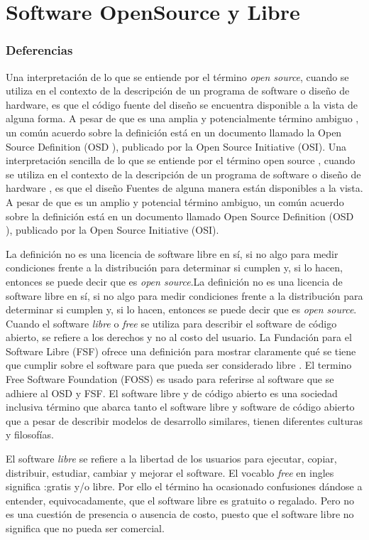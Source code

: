 \chapter{Software OpenSource y Libre}
		\subsection{Deferencias} 
Una interpretación de lo que se entiende por el término \textit{open source}, cuando se utiliza en el contexto de la descripción de un programa de software o diseño de hardware, es que el código fuente del diseño se encuentra disponible a la vista de alguna forma. A pesar de que es una amplia y potencialmente término ambiguo , un común acuerdo sobre la definición está en un documento llamado la Open Source Definition (OSD ), publicado por la Open Source Initiative (OSI).
Una interpretación sencilla de lo que se entiende por el término open source , cuando se utiliza en el contexto de la descripción de un programa de software o diseño de hardware , es que el diseño Fuentes de alguna manera están disponibles a la vista. A pesar de que es un amplio y potencial término ambiguo, un común acuerdo sobre la definición está en un documento llamado  Open Source Definition (OSD ), publicado por la Open Source Initiative (OSI).

La definición no es una licencia de software libre en sí, si no algo para medir condiciones frente a la distribución para determinar si cumplen y, si lo hacen, entonces se puede decir que es \textit{open source}\cite{Etiqueta06}.La definición no es una licencia de software libre en sí, si no algo para medir condiciones frente a la distribución para determinar si cumplen y, si lo hacen, entonces se puede decir que es \textit{open source}. Cuando el software \textit{libre} o \textit{free} se utiliza para describir el software de código abierto, se refiere a los derechos y no al costo del usuario. La Fundación para el Software Libre (FSF) ofrece una definición para mostrar claramente qué se tiene que cumplir sobre el software para que pueda ser considerado libre \cite{Etiqueta07}. El termino Free Software Foundation (FOSS) es usado para referirse al software que se adhiere al OSD y FSF. El software libre y de código abierto es una sociedad inclusiva término que abarca tanto el software libre y software de código abierto que a pesar de describir modelos de desarrollo similares, tienen diferentes culturas y filosofías.

El software \textit{libre} se refiere a la libertad de los usuarios para ejecutar, copiar, distribuir, estudiar, cambiar y mejorar el software. El vocablo \textit{free} en ingles significa :gratis y/o libre. Por ello el término ha ocasionado confusiones dándose a entender, equivocadamente, que el software libre es gratuito o regalado. Pero no es una cuestión de presencia o ausencia de costo, puesto que el software libre no significa que no pueda ser comercial.

